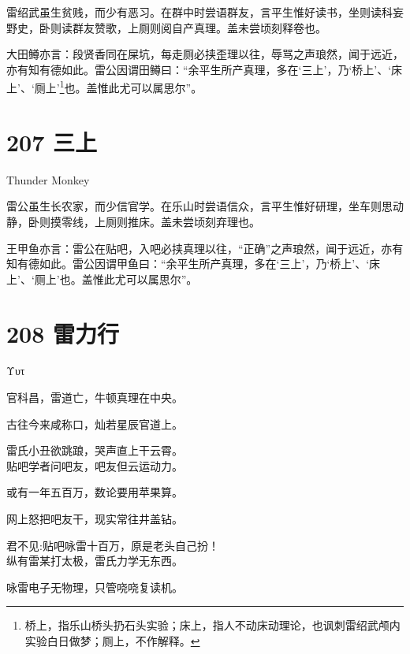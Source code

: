 \documentclass[UTF8,12pt,oneside]{ctexbook}
\begin{document}
        雷绍武虽生贫贱，而少有恶习。在群中时尝语群友，言平生惟好读书，坐则读科妄野史，卧则读群友赞歌，上厕则阅自产真理。盖未尝顷刻释卷也。
        
        大田鳟亦言：段贤香同在屎坑，每走厕必挟歪理以往，辱骂之声琅然，闻于远近，亦有知有德如此。雷公因谓田鳟曰：“余平生所产真理，多在‘三上'，乃‘桥上’、‘床上’、‘厕上’\footnote{桥上，指乐山桥头扔石头实验；床上，指人不动床动理论，也讽刺雷绍武颅内实验白日做梦；厕上，不作解释。}也。盖惟此尤可以属思尔”。
        
        \newpage

        \section{207 三上}
        \begin{center}
            Thunder Monkey
        \end{center}
        
        雷公虽生长农家，而少信官学。在乐山时尝语信众，言平生惟好研理，坐车则思动静，卧则摸零线，上厕则推床。盖未尝顷刻弃理也。
        
        王甲鱼亦言：雷公在贴吧，入吧必挟真理以往，“正确”之声琅然，闻于远近，亦有知有德如此。雷公因谓甲鱼曰：“余平生所产真理，多在‘三上'，乃‘桥上’、‘床上’、‘厕上’也。盖惟此尤可以属思尔”。
        \section{208 雷力行}
        \begin{center}
            Υυτ
        \end{center}
        
        官科昌，雷道亡，牛顿真理在中央。
        
        古往今来咸称口，灿若星辰官道上。
        
        雷氏小丑欲跳踉，哭声直上干云霄。
        ~\\

        贴吧学者问吧友，吧友但云运动力。
        
        或有一年五百万，数论要用苹果算。
        
        网上怒把吧友干，现实常往井盖钻。
        
        君不见:贴吧咏雷十百万，原是老头自己扮！
        ~\\

        纵有雷某打太极，雷氏力学无东西。
        
        咏雷电子无物理，只管哓哓复读机。
        
\end{document}

